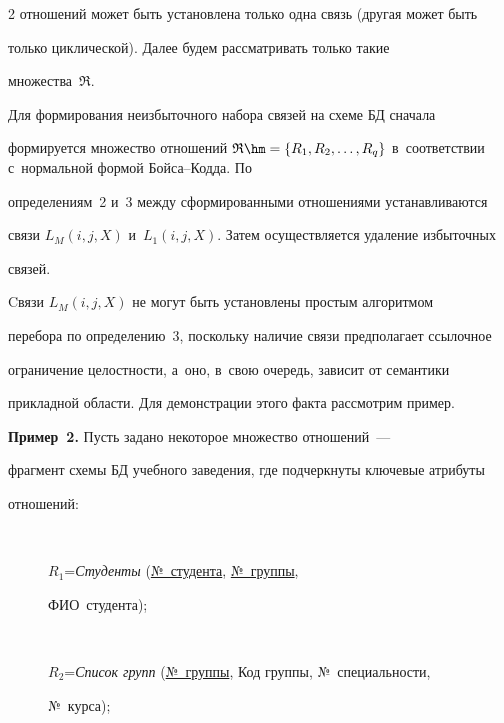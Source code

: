 \begin{multicols}{2}
отношений может быть установлена только одна связь (другая может быть

только циклической). Далее будем рассматривать только такие

множества~$\mathfrak{R}$.



  Для формирования неизбыточного набора связей на схеме БД сначала

формируется множество отношений $\mathfrak{R}\hm= \{R_1, R_2, \ldots ,

R_q\}$ в~соответствии с~нормальной формой Бой\-са--Код\-да. По

определениям~2 и~3 между сформированными отношениями устанавливаются

связи $L_M(i,j,X)$ и~$L_1(i,j,X)$. Затем осуществляется удаление избыточных

связей.



  Cвязи $L_M(i,j,X)$ не могут быть установлены простым алгоритмом

перебора по определению~3, поскольку наличие связи предполагает ссылочное

ограничение целостности, а~оно, в~свою очередь, зависит от семантики

прикладной области. Для демонстрации этого факта рассмотрим пример.



  \smallskip



  \noindent

  \textbf{Пример~2.} Пусть задано некоторое множество отношений~---

фрагмент схемы БД учебного заведения, где подчеркнуты ключевые атрибуты

отношений:

\begin{description}

\item[\,]

  $R_1$\;=\;\textit{Студенты} (\underline{№~студента}, \underline{№~группы}, 

  ФИО~студента);



\item[\,]

  $R_2$\;=\;\textit{Список групп} (\underline{№~группы}, Код группы, №~специальности,

№~курса);

\item[\,]


\end{description}
\end{multicols}
